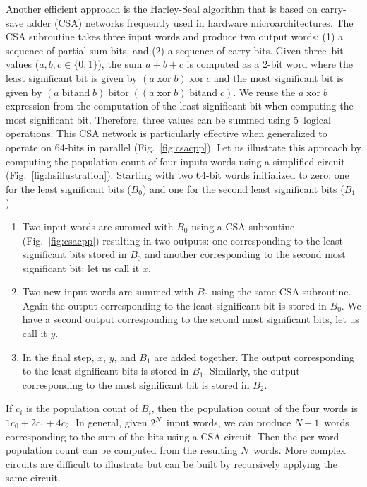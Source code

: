 \documentclass[AMA,STIX1COL]{WileyNJD-v2}
\DeclareMathOperator{\bitwiseand}{bitand}
\DeclareMathOperator{\bitwiseor}{bitor}
\DeclareMathOperator{\bitwisexor}{xor}
\begin{document}
Another efficient approach\cite{warren2007} is the Harley-Seal algorithm that is based on carry-save adder (CSA) networks frequently used in hardware microarchitectures. The CSA subroutine takes three input words and produce two output words: (1) a sequence of partial sum bits, and (2) a sequence of carry bits.
Given three~bit values ($a,b,c\in \{0,1\}$), the sum $a + b + c$ is computed as a 2-bit word where the least significant bit is given by $(a\bitwisexor b) \bitwisexor c$ and the most significant bit is given by $(a \bitwiseand b) \bitwiseor ( (a \bitwisexor b) \bitwiseand c )$. We reuse the $a \bitwisexor b$ expression from the computation of the least significant bit when computing the most significant bit. Therefore, three values can be summed using 5~logical operations. This CSA network is particularly effective when generalized to operate on 64-bits in parallel (Fig.~\ref{fig:csacpp}).
Let us illustrate this approach by computing the population count of four inputs words using a simplified circuit (Fig.~\ref{fig:hsillustration}). Starting with two 64-bit words initialized to zero: one for the least significant bits ($B_0$) and one for the second least significant bits ($B_1$). 
\begin{enumerate}
    \item Two input words are summed with $B_0$ using a CSA subroutine (Fig.~\ref{fig:csacpp}) resulting in two outputs: one corresponding to the least significant bits stored in $B_0$ and another corresponding to the second most significant bit: let us call it $x$.
    \item Two new input words are summed with $B_0$ using the same CSA subroutine. Again the output corresponding to the least significant bit is stored in $B_0$. We have a second output corresponding to the second most significant bits, let us call it $y$.
    \item In the final step, $x$, $y$, and $B_1$ are added together. The output corresponding to the least significant bits is stored in $B_1$. Similarly, the output corresponding to the most significant bit is stored in $B_2$.
\end{enumerate}
If $c_i$ is the population count of $B_i$, then the population count of the four words is $1 c_0 + 2 c_1 + 4 c_2$. In general, given $2^N$~input words, we can produce $N+1$~words corresponding to the sum of the bits using a CSA circuit. Then the per-word population count can be computed from the resulting $N$~words. 
More complex circuits are difficult to illustrate but can be built by recursively applying the same circuit. %
\end{document}
